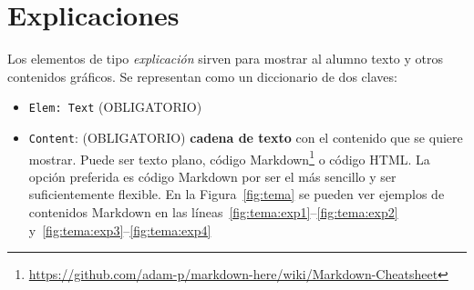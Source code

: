 \documentclass[]{article}
\newcommand{\code}[1]{{\lstinline[basicstyle=\ttfamily,mathescape]!#1!}}
\begin{document}
\section{Explicaciones}\label{sec:explicaciones}
Los elementos de tipo \emph{explicación} sirven para mostrar al alumno texto y otros contenidos gráficos. Se representan como un diccionario de dos claves:
\begin{itemize}
	 \item \code{Elem: Text} {\sf (OBLIGATORIO)}
	 \item \code{Content}: {\sf (OBLIGATORIO)} \textbf{cadena de texto} con el contenido que se quiere mostrar. Puede ser texto plano, código Markdown\footnote{\url{https://github.com/adam-p/markdown-here/wiki/Markdown-Cheatsheet}} o código HTML. La opción preferida es código Markdown por ser el más sencillo y ser suficientemente flexible. En la Figura~\ref{fig:tema} se pueden ver ejemplos de contenidos Markdown en las líneas~\ref{fig:tema:exp1}--\ref{fig:tema:exp2} y~\ref{fig:tema:exp3}--\ref{fig:tema:exp4}
\end{itemize}
\end{document}
